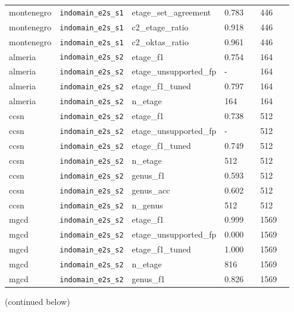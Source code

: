 \begin{center}
{\begin{tabular}{lllllll}
montenegro & \texttt{indomain\_\allowbreak{}e2s\_\allowbreak{}s1} & etage\_set\_agreement & 0.783 &  & 446 &  \\
montenegro & \texttt{indomain\_\allowbreak{}e2s\_\allowbreak{}s1} & c2\_etage\_ratio & 0.918 &  & 446 &  \\
montenegro & \texttt{indomain\_\allowbreak{}e2s\_\allowbreak{}s1} & c2\_oktas\_ratio & 0.961 &  & 446 &  \\
almeria & \texttt{indomain\_\allowbreak{}e2s\_\allowbreak{}s2} & etage\_f1 & 0.754 &  & 164 &  \\
almeria & \texttt{indomain\_\allowbreak{}e2s\_\allowbreak{}s2} & etage\_unsupported\_fp & - &  & 164 &  \\
almeria & \texttt{indomain\_\allowbreak{}e2s\_\allowbreak{}s2} & etage\_f1\_tuned & 0.797 &  & 164 &  \\
almeria & \texttt{indomain\_\allowbreak{}e2s\_\allowbreak{}s2} & n\_etage & 164 &  & 164 &  \\
ccsn & \texttt{indomain\_\allowbreak{}e2s\_\allowbreak{}s2} & etage\_f1 & 0.738 &  & 512 &  \\
ccsn & \texttt{indomain\_\allowbreak{}e2s\_\allowbreak{}s2} & etage\_unsupported\_fp & - &  & 512 &  \\
ccsn & \texttt{indomain\_\allowbreak{}e2s\_\allowbreak{}s2} & etage\_f1\_tuned & 0.749 &  & 512 &  \\
ccsn & \texttt{indomain\_\allowbreak{}e2s\_\allowbreak{}s2} & n\_etage & 512 &  & 512 &  \\
ccsn & \texttt{indomain\_\allowbreak{}e2s\_\allowbreak{}s2} & genus\_f1 & 0.593 &  & 512 &  \\
ccsn & \texttt{indomain\_\allowbreak{}e2s\_\allowbreak{}s2} & genus\_acc & 0.602 &  & 512 &  \\
ccsn & \texttt{indomain\_\allowbreak{}e2s\_\allowbreak{}s2} & n\_genus & 512 &  & 512 &  \\
mgcd & \texttt{indomain\_\allowbreak{}e2s\_\allowbreak{}s2} & etage\_f1 & 0.999 &  & 1569 &  \\
mgcd & \texttt{indomain\_\allowbreak{}e2s\_\allowbreak{}s2} & etage\_unsupported\_fp & 0.000 &  & 1569 &  \\
mgcd & \texttt{indomain\_\allowbreak{}e2s\_\allowbreak{}s2} & etage\_f1\_tuned & 1.000 &  & 1569 &  \\
mgcd & \texttt{indomain\_\allowbreak{}e2s\_\allowbreak{}s2} & n\_etage & 816 &  & 1569 &  \\
mgcd & \texttt{indomain\_\allowbreak{}e2s\_\allowbreak{}s2} & genus\_f1 & 0.826 &  & 1569 &  \\
\bottomrule
\end{tabular}}\par\footnotesize(continued below)
\end{center}


